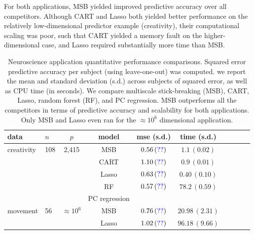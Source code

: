 \documentclass{article} %
\newcommand{\dd}[1]{{\color{blue}{\it #1}}}
\begin{document}
For both applications, MSB yielded improved predictive accuracy over all competitors.  Although CART and Lasso both yielded better performance on the relatively low-dimensional predictor example (creativity), their computational scaling was poor, such that CART yielded a memory fault on the higher-dimensional case, and Lasso required substantially more time than MSB.  







\begin{table}[t]
\caption{Neuroscience application quantitative performance comparisons. Squared error predictive accuracy per subject (using leave-one-out) was computed. we report the mean and standard deviation (s.d.) across subjects of squared error, as well as CPU time (in seconds).
We compare multiscale stick-breaking (MSB), CART, Lasso, random forest (RF), and PC regression. MSB outperforms all the competitors in terms of predictive accuracy and scalability for both applications.  Only MSB and Lasso even ran for the $\approx 10^6$ dimensional application.}\label{real}
\vskip 0.15in
\begin{center}
\begin{small}
\begin{sc}
\begin{tabular}{llcccccccc}
\hline
data &$n$&$p$ &model&mse (s.d.) & time (s.d.) \\ %
\hline
creativity & 108 & 2,415 & MSB &$0.56 \, (\dd{??})$ &  $1.1 \, (0.02)$\\
 &&& CART & $1.10 \, (\dd{??}) $ &  $0.9 \, (0.01)$\\
&&& Lasso & $0.63 \, (\dd{??})$  &  $0.40 \, (0.10)$\\
&&& RF & $0.57 \, (\dd{??})$ &   $78.2 \, (0.59)$\\
&&& PC regression & \dd{??,  (??)} & \dd{?? , (??)}
\\
\hline
 movement & 56 & $\approx 10^6$& MSB &$0.76 \, (\dd{??})$  & $20.98 \, (2.31)$\\
 &&& Lasso & $1.02 \, (\dd{??})$ & $96.18 \, (9.66)$\\
\hline
\end{tabular}
\end{sc}
\end{small}
\end{center}
\vspace{-15pt}
\end{table}
\end{document}
